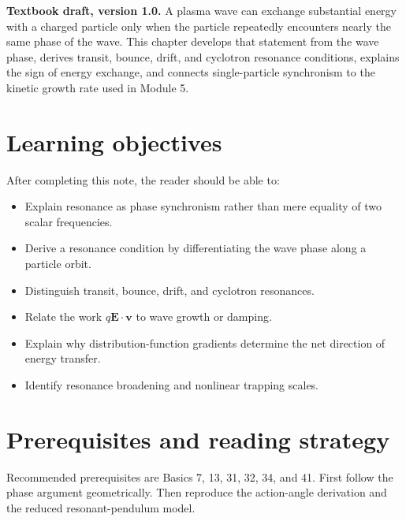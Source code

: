 \documentclass[11pt]{article}
\begin{document}

\begin{overviewbox}
\textbf{Textbook draft, version 1.0.} A plasma wave can exchange substantial energy with a charged particle only when the particle repeatedly encounters nearly the same phase of the wave. This chapter develops that statement from the wave phase, derives transit, bounce, drift, and cyclotron resonance conditions, explains the sign of energy exchange, and connects single-particle synchronism to the kinetic growth rate used in Module 5.
\end{overviewbox}

\ProjectTOC

\section{Learning objectives}
After completing this note, the reader should be able to:
\begin{itemize}[leftmargin=1.6em]
\item Explain resonance as phase synchronism rather than mere equality of two scalar frequencies.
\item Derive a resonance condition by differentiating the wave phase along a particle orbit.
\item Distinguish transit, bounce, drift, and cyclotron resonances.
\item Relate the work $q\mathbf E\cdot\mathbf v$ to wave growth or damping.
\item Explain why distribution-function gradients determine the net direction of energy transfer.
\item Identify resonance broadening and nonlinear trapping scales.
\end{itemize}

\section{Prerequisites and reading strategy}
Recommended prerequisites are Basics 7, 13, 31, 32, 34, and 41. First follow the phase argument geometrically. Then reproduce the action-angle derivation and the reduced resonant-pendulum model.
\end{document}
